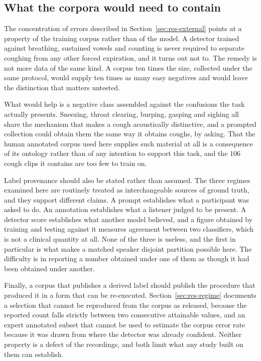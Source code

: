 \documentclass{ieeeaccess}
\begin{document}
\subsection{What the corpora would need to contain}\label{sec:disc-corpora}

The concentration of errors described in Section~\ref{sec:res-external} points at a
property of the training corpus rather than of the model. A detector trained against
breathing, sustained vowels and counting is never required to separate coughing from any
other forced expiration, and it turns out not to. The remedy is not more data of the same
kind. A corpus ten times the size, collected under the same protocol, would supply ten
times as many easy negatives and would leave the distinction that matters untested.

What would help is a negative class assembled against the confusions the task actually
presents. Sneezing, throat clearing, burping, gasping and sighing all share the mechanism
that makes a cough acoustically distinctive, and a prompted collection could obtain them
the same way it obtains coughs, by asking. That the human annotated corpus used here
supplies such material at all is a consequence of its ontology rather than of any
intention to support this task, and the $106$ cough clips it contains are too few to
train on.

Label provenance should also be stated rather than assumed. The three regimes examined
here are routinely treated as interchangeable sources of ground truth, and they support
different claims. A prompt establishes what a participant was asked to do. An annotation
establishes what a listener judged to be present. A detector score establishes what
another model believed, and a figure obtained by training and testing against it measures
agreement between two classifiers, which is not a clinical quantity at all. None of the
three is useless, and the first in particular is what makes a matched speaker disjoint
partition possible here. The difficulty is in reporting a number obtained under one of
them as though it had been obtained under another.

Finally, a corpus that publishes a derived label should publish the procedure that
produced it in a form that can be re-executed. Section~\ref{sec:res-regime} documents a
selection that cannot be reproduced from the corpus as released, because the reported
count falls strictly between two consecutive attainable values, and an expert annotated
subset that cannot be used to estimate the corpus error rate because it was drawn from
where the detector was already confident. Neither property is a defect of the recordings,
and both limit what any study built on them can establish.
\end{document}
